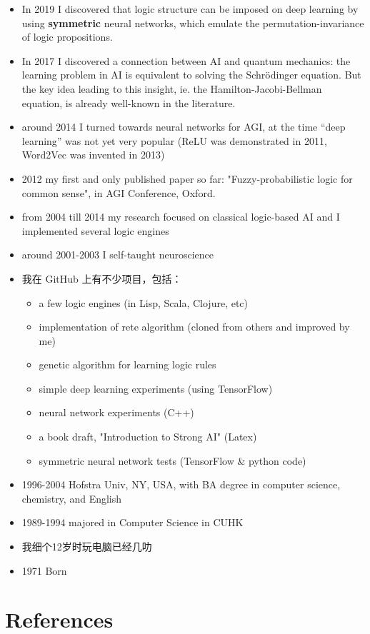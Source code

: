 \begin{itemize}
	\item In 2019 I discovered that logic structure can be imposed on deep learning by using \textbf{symmetric} neural networks, which emulate the permutation-invariance of logic propositions.
	\item In 2017 I discovered a connection between AI and quantum mechanics: the learning problem in AI is equivalent to solving the Schr\"{o}dinger equation.  But the key idea leading to this insight, ie. the Hamilton-Jacobi-Bellman equation, is already well-known in the literature.

	\item around 2014 I turned towards neural networks for AGI, at the time ``deep learning'' was not yet very popular (ReLU was demonstrated in 2011, Word2Vec was invented in 2013)
	\item 2012 my first and only published paper so far: "Fuzzy-probabilistic logic for common sense", in AGI Conference, Oxford.
	\item from 2004 till 2014 my research focused on classical logic-based AI and I implemented several logic engines
	\item around 2001-2003 I self-taught neuroscience

	\item 我在 GitHub 上有不少项目，包括：
	\begin{itemize}
		\item a few logic engines (in Lisp, Scala, Clojure, etc)
		\item implementation of rete algorithm (cloned from others and improved by me)
		\item genetic algorithm for learning logic rules
		\item simple deep learning experiments (using TensorFlow)
		\item neural network experiments (C++)
		\item a book draft, "Introduction to Strong AI" (Latex)
		\item symmetric neural network tests (TensorFlow \& python code)
	\end{itemize}

	\item 1996-2004 Hofstra Univ, NY, USA, with BA degree in computer science, chemistry, and English
	\item 1989-1994 majored in Computer Science in CUHK
	\item 我细个12岁时玩电脑已经几叻
	\item 1971 Born
\end{itemize}



\section*{References}

 
